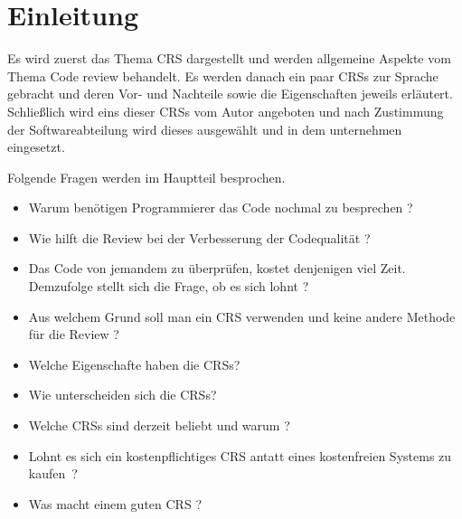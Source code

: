 \section{Einleitung}
Es wird zuerst das Thema \ac{CRS} dargestellt und werden allgemeine Aspekte vom Thema Code review behandelt.
Es werden danach ein paar \acp{CRS} zur Sprache gebracht und deren Vor- und Nachteile sowie die Eigenschaften jeweils erläutert.
Schließlich wird eins dieser \acp{CRS} vom Autor angeboten und nach Zustimmung der Softwareabteilung wird dieses ausgewählt und in dem unternehmen eingesetzt.

Folgende Fragen werden im Hauptteil besprochen.

\begin{itemize}
\item Warum benötigen Programmierer das Code nochmal zu besprechen ?
\item Wie hilft die Review bei der Verbesserung der Codequalität ?
\item Das Code von jemandem zu überprüfen, kostet denjenigen viel Zeit. Demzufolge stellt sich die Frage, ob es sich lohnt ?
\item Aus welchem Grund soll man ein \ac{CRS} verwenden und keine andere Methode für die Review ?
\item Welche Eigenschafte haben die \acp{CRS}?
\item Wie unterscheiden sich die \acp{CRS}?
\item Welche \acp{CRS} sind derzeit beliebt und warum ?
\item Lohnt es sich ein kostenpflichtiges \ac{CRS} antatt eines kostenfreien Systems zu kaufen~?
\item Was macht einem guten \ac{CRS} ?
\end{itemize}

\newpage
\listoftodos